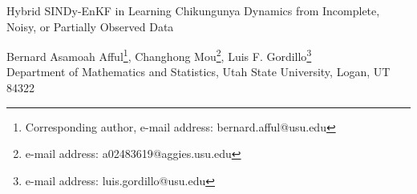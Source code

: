 \documentclass[9pt]{article}
\numberwithin{equation}{section}
\begin{document}
\begin{titlepage}
\LARGE{
\begin{center}
Hybrid SINDy-EnKF in Learning Chikungunya Dynamics from Incomplete, Noisy, or Partially Observed Data
\end{center}
}
\large{
\begin{center} 
Bernard Asamoah Afful\footnote{Corresponding author, e-mail address: bernard.afful@usu.edu}, Changhong Mou\footnote{e-mail address:  a02483619@aggies.usu.edu}, Luis F. Gordillo\footnote{e-mail address:  luis.gordillo@usu.edu} \\[0.3cm]
Department of Mathematics and Statistics, Utah State University, Logan, UT 84322\\
\end{center}
\begin{abstract}
\noindent 
Current mechanistic models for the transmission dynamics of the Chikungunya virus (CHIKV) rely on uncertain parameters or partially observed data. This limitation challenges the use of theoretical models for understanding and forecasting disease spread. Here we present a hybrid, data-driven model framework that combines Sparse Identification of Nonlinear Dynamics (SINDy) with the Ensemble Kalman Filter (EnKF) for sequential data assimilation. Our numerical experiments show that this approach improves prediction accuracy and provides a good reconstruction of unobserved trajectories under partial observability, a common constraint in real-world epidemiological surveillance. SINDy can be applied to epidemic trajectories, recovering the underlying equations in noise-free conditions. However, standalone SINDy is highly sensitive to noise, leading to spurious terms and poor performance.  Hence, we embed the identification procedure within an EnKF framework, which assimilates noisy observations to correct forecast states from the SINDy-derived model and to infer unobserved state variables.
\\[0.3cm]
\noindent
\textbf{Keywords: }Chikungunya virus (CHIKV); Sparse Identification of Nonlinear Dynamics (SINDy); Ensemble Kalman Filter (EnKF); Data assimilation; Infectious disease dynamics; Computational epidemiology.
\end{abstract}
}
\end{titlepage}

\end{document}
